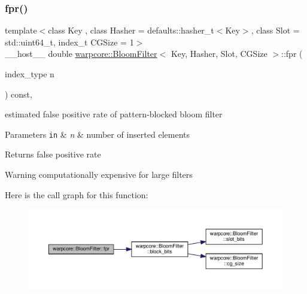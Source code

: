 \subsubsection{\texorpdfstring{fpr()}{fpr()}}
{\footnotesize\ttfamily template$<$class Key , class Hasher  = defaults\+::hasher\+\_\+t$<$\+Key$>$, class Slot  = std\+::uint64\+\_\+t, index\+\_\+t C\+G\+Size = 1$>$ \\
\+\_\+\+\_\+host\+\_\+\+\_\+ double \hyperlink{classwarpcore_1_1BloomFilter}{warpcore\+::\+Bloom\+Filter}$<$ Key, Hasher, Slot, C\+G\+Size $>$\+::fpr (\begin{DoxyParamCaption}\item[{index\+\_\+type}]{n }\end{DoxyParamCaption}) const\hspace{0.3cm}{\ttfamily [inline]}, {\ttfamily [noexcept]}}



estimated false positive rate of pattern-\/blocked bloom filter 


\begin{DoxyParams}[1]{Parameters}
\mbox{\tt in}  & {\em n} & number of inserted elements \\
\hline
\end{DoxyParams}
\begin{DoxyReturn}{Returns}
false positive rate 
\end{DoxyReturn}
\begin{DoxyWarning}{Warning}
computationally expensive for large filters 
\end{DoxyWarning}
Here is the call graph for this function\+:
\nopagebreak
\begin{figure}[H]
\begin{center}
\leavevmode
\includegraphics[width=350pt]{classwarpcore_1_1BloomFilter_af77c52ec3c2223cfe335a65197bed625_cgraph}
\end{center}
\end{figure}
\mbox{\label{classwarpcore_1_1BloomFilter_ac9e663f21e94822fc214b75c623436f5}} 
